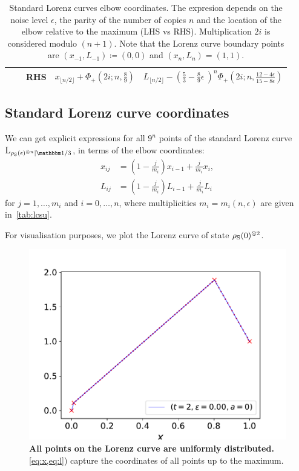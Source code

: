 \begin{table}[h]
\begin{tabular}{c|c|c|r|r}
    & & RHS & $x_{\lfloor n/2 \rfloor} + \Phi_+\left(2i;n,\frac{8}{9}\right)$ & $L_{\lfloor n/2 \rfloor} - \left( \frac{5}{3} - \frac{8}{9}\epsilon\ \right)^n\Phi_+\left(2i;n,\frac{12-4\epsilon}{15-8\epsilon}\right)$ \\ \hline
  \end{tabular}
  \caption{Standard Lorenz curves elbow coordinates.
  The expresion depends on the noise level $\epsilon$, the parity of the number of copies $n$ and the location of the elbow relative to the maximum (LHS vs RHS).
  Multiplication $2i$ is considered modulo $(n+1)$.
  Note that the Lorenz curve boundary points are $(x_{-1}, L_{-1}) \coloneqq (0,0)$ and $(x_{n}, L_{n}) = (1,1)$.
  }
  \label{tab:lcsu_coord_elb_app}
\end{table}

\subsection{Standard Lorenz curve coordinates}\label{app:lcsu_coord}
We can get explicit expressions for all $9^{n}$ points of the standard Lorenz curve $\lc{\rho_{\rm{S}}(\epsilon)^{\otimes n}}{\id/3}$, in terms of the elbow coordinates:
\begin{align}
    x_{ij} &= \left( 1-\frac{j}{m_{i}} \right) x_{i-1} + \frac{j}{m_{i}} x_{i}, \label{eq:x}\\
    L_{ij} &= \left( 1-\frac{j}{m_{i}} \right) L_{i-1} + \frac{j}{m_{i}} L_{i} \label{eq:l}
\end{align}
for $j = 1,\dots,m_{i}$ and $i=0,\dots,n$, where multiplicities $m_i = m_i(n, \epsilon)$ are given in~\cref{tab:lcsu}.

For visualisation purposes, we plot the Lorenz curve of state $\rho_{\rm{S}}(0)^{\otimes 2}$.
\begin{figure}[t]
    \centering
    \includegraphics[scale=0.6]{figs/lcpoints.pdf}
    \caption{\textbf{All points on the Lorenz curve are uniformly distributed.}
    \cref{eq:x,eq:l}) capture the coordinates of all points up to the maximum.
    }
    \label{fig:lc}
\end{figure}

